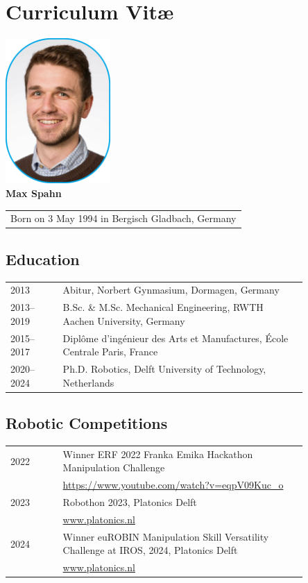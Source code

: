 \chapter*{Curriculum Vit\ae}
\begin{center}
    \includegraphics[width=0.3\textwidth]{src/helpers/cv/max_spahn.png}\\
    \vspace{0.5cm}
    {\Large\textbf{Max Spahn}} \\
    \vspace{0.2cm}
    \begin{tabular}{c}
        Born on 3 May 1994 in Bergisch Gladbach, Germany
    \end{tabular}
\end{center}

\section*{Education}

\begin{tabular}{p{0.15\linewidth} p{0.7\linewidth}}
  2013 & Abitur, Norbert Gynmasium, Dormagen, Germany\\
    2013--2019 & B.Sc. \& M.Sc. Mechanical Engineering, RWTH Aachen University, Germany\\
    2015--2017 & Diplôme d'ingénieur des Arts et Manufactures, École Centrale Paris, France\\
    2020--2024 & Ph.D. Robotics, Delft University of Technology, Netherlands \\
\end{tabular}

\section*{Robotic Competitions}
\begin{tabular}{p{0.15\linewidth} p{0.7\linewidth}}
  2022 & Winner ERF 2022 Franka Emika Hackathon Manipulation
  Challenge\\
  & \url{https://www.youtube.com/watch?v=eqpV09Kuc_o} \\
  2023 & Robothon 2023, Platonics Delft \\
  & \url{www.platonics.nl} \\
  2024 & Winner euROBIN Manipulation Skill Versatility Challenge at
  IROS, 2024, Platonics Delft \\
  & \url{www.platonics.nl} \\
\end{tabular}
